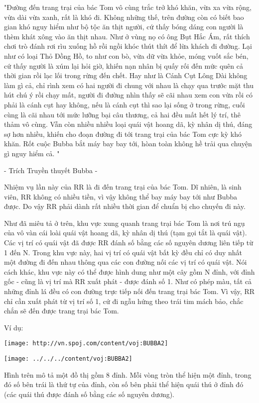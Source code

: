 "Đường đến trang trại của bác Tom vô cùng trắc trở khó khăn, vừa xa vừa rộng, vừa dài vừa xanh, rất là khó đi. Không những thế, trên đường còn có biết bao gian khó nguy hiểm như bộ tộc ăn thịt người, cứ thấy bóng dáng con người là thèm khát xông vào ăn thịt nhau. Như ở vùng nọ có ông Bụt Hắc Ám, rất thích chơi trò đánh rơi rìu xuống hồ rồi ngồi khóc thút thít để lừa khách đi đường. Lại như có loại Thỏ Đồng Hồ, to như con bò, vừa dữ vừa khỏe, móng vuốt sắc bén, cứ thấy người là xúm lại hỏi giờ, khiến nạn nhân bị quấy rối đến mức quên cả thời gian rồi lạc lối trong rừng đến chết. Hay như là Cánh Cụt Lông Dài không làm gì cả, chỉ rình xem có hai người đi chung với nhau là chạy qua trước mặt thu hút chú ý rồi chạy mất, người đi đường nhìn thấy sẽ cãi nhau xem con vừa rồi có phải là cánh cụt hay không, nếu là cánh cụt thì sao lại sống ở trong rừng, cuối cùng là cãi nhau tới mức lưỡng bại câu thương, cả hai đều mất hết lý trí, thê thảm vô cùng. Vẫn còn nhiều nhiều loại quái vật hoang dã, kỳ nhân dị thú, đáng sợ hơn nhiều, khiến cho đoạn đường đi tới trang trại của bác Tom cực kỳ khó khăn. Rốt cuộc Bubba bắt máy bay bay tới, hòan toàn không hề trải qua chuyện gì nguy hiểm cả. "

- Trích Truyền thuyết Bubba -

Nhiệm vụ lần này của RR là đi đến trang trại của bác Tom. Dĩ nhiên, là sinh viên, RR không có nhiều tiền, vì vậy không thể bay máy bay tới như Bubba được. Do vậy RR phải dành rất nhiều thời gian để chuẩn bị cho chuyến đi này.

Như đã miêu tả ở trên, khu vực xung quanh trang trại bác Tom là nơi trú ngụ của vô vàn cái loài quái vật hoang dã, kỳ nhân dị thú (tạm gọi tắt là quái vật). Các vị trí có quái vật đã được RR đánh số bằng các số nguyên dương liên tiếp từ 1 đến N. Trong khu vực này, hai vị trí có quái vật bất kỳ đều chỉ có duy nhất một đường đi đến nhau thông qua các con đường nối các vị trí có quái vật. Nói cách khác, khu vực này có thể được hình dung như một cây gồm N đỉnh, với đỉnh gốc - cũng là vị trí mà RR xuất phát - được đánh số 1. Như có phép màu, tất cả những đỉnh lá đều có con đường trực tiếp nối đến trang trại bác Tom. Vì vậy, RR chỉ cần xuất phát từ vị trí số 1, cứ đi ngẫu hứng theo trái tim mách bảo, chắc chắn sẽ đến được trang trại bác Tom.

Ví dụ:


\texttt{[image: http://vn.spoj.com/content/voj:BUBBA2]}


\texttt{[image: ../../../content/voj:BUBBA2]}

Hình trên mô tả một đồ thị gồm 8 đỉnh. Mỗi vòng tròn thể hiện một đỉnh, trong đó số bên trái là thứ tự của đỉnh, còn số bên phải thể hiện quái thú ở đỉnh đó (các quái thú được đánh số bằng các số nguyên dương).

